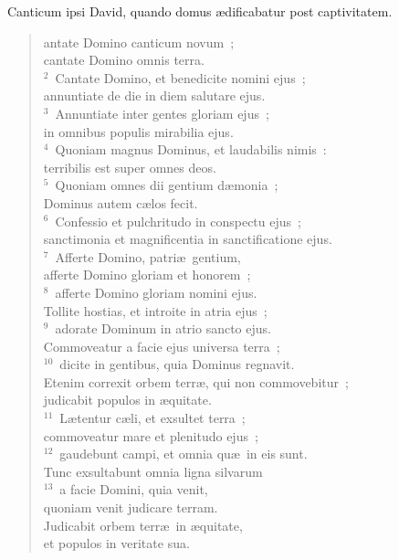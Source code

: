 \bchapter[Psalm]
Canticum ipsi David, quando domus \ae dificabatur post captivitatem. \begin{verse}antate Domino canticum novum~;\\ cantate Domino omnis terra.\\
${}^{2}$~Cantate Domino, et benedicite nomini ejus~;\\ annuntiate de die in diem salutare ejus.\\
${}^{3}$~Annuntiate inter gentes gloriam ejus~;\\ in omnibus populis mirabilia ejus.\\
${}^{4}$~Quoniam magnus Dominus, et laudabilis nimis~:\\ terribilis est super omnes deos.\\
${}^{5}$~Quoniam omnes dii gentium d\ae monia~;\\ Dominus autem c\ae los fecit.\\
${}^{6}$~Confessio et pulchritudo in conspectu ejus~;\\ sanctimonia et magnificentia in sanctificatione ejus.\\
${}^{7}$~Afferte Domino, patri\ae\ gentium,\\ afferte Domino gloriam et honorem~;\\
${}^{8}$~afferte Domino gloriam nomini ejus.\\ Tollite hostias, et introite in atria ejus~;\\
${}^{9}$~adorate Dominum in atrio sancto ejus.\\ Commoveatur a facie ejus universa terra~;\\
${}^{10}$~dicite in gentibus, quia Dominus regnavit.\\ Etenim correxit orbem terr\ae , qui non commovebitur~;\\ judicabit populos in \ae quitate.\\
${}^{11}$~L\ae tentur c\ae li, et exsultet terra~;\\ commoveatur mare et plenitudo ejus~;\\
${}^{12}$~gaudebunt campi, et omnia qu\ae\ in eis sunt.\\ Tunc exsultabunt omnia ligna silvarum\\
${}^{13}$~a facie Domini, quia venit,\\ quoniam venit judicare terram.\\ Judicabit orbem terr\ae\ in \ae quitate,\\ et populos in veritate sua.\end{verse}



